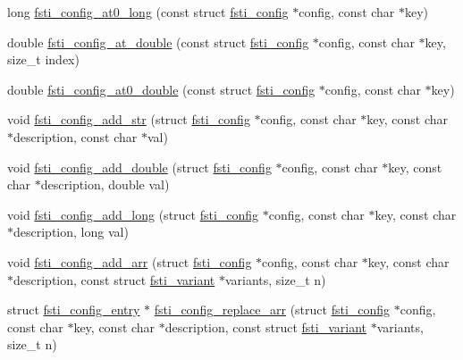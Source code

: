 \begin{DoxyCompactItemize}
\item 
long \mbox{\hyperlink{fsti-config_8c_a9f3d5723f366dc5de1ed8c23c32db499}{fsti\+\_\+config\+\_\+at0\+\_\+long}} (const struct \mbox{\hyperlink{structfsti__config}{fsti\+\_\+config}} $\ast$config, const char $\ast$key)
\item 
double \mbox{\hyperlink{fsti-config_8c_a62f94d64fed8d92993151b3fcbfa6a3f}{fsti\+\_\+config\+\_\+at\+\_\+double}} (const struct \mbox{\hyperlink{structfsti__config}{fsti\+\_\+config}} $\ast$config, const char $\ast$key, size\+\_\+t index)
\item 
double \mbox{\hyperlink{fsti-config_8c_a3e479a269882550f86538865a4c76d1e}{fsti\+\_\+config\+\_\+at0\+\_\+double}} (const struct \mbox{\hyperlink{structfsti__config}{fsti\+\_\+config}} $\ast$config, const char $\ast$key)
\item 
void \mbox{\hyperlink{fsti-config_8c_a3ee06dfcfc2e683469ca7ed25f9dc7a4}{fsti\+\_\+config\+\_\+add\+\_\+str}} (struct \mbox{\hyperlink{structfsti__config}{fsti\+\_\+config}} $\ast$config, const char $\ast$key, const char $\ast$description, const char $\ast$val)
\item 
void \mbox{\hyperlink{fsti-config_8c_ac687fc8ca6887aae337ce8ef4188f089}{fsti\+\_\+config\+\_\+add\+\_\+double}} (struct \mbox{\hyperlink{structfsti__config}{fsti\+\_\+config}} $\ast$config, const char $\ast$key, const char $\ast$description, double val)
\item 
void \mbox{\hyperlink{fsti-config_8c_aeeb0d90b0edb706662e123f6747b2a3c}{fsti\+\_\+config\+\_\+add\+\_\+long}} (struct \mbox{\hyperlink{structfsti__config}{fsti\+\_\+config}} $\ast$config, const char $\ast$key, const char $\ast$description, long val)
\item 
void \mbox{\hyperlink{fsti-config_8c_a5d0a69eb0415adc0b32d29a92c002890}{fsti\+\_\+config\+\_\+add\+\_\+arr}} (struct \mbox{\hyperlink{structfsti__config}{fsti\+\_\+config}} $\ast$config, const char $\ast$key, const char $\ast$description, const struct \mbox{\hyperlink{structfsti__variant}{fsti\+\_\+variant}} $\ast$variants, size\+\_\+t n)
\item 
struct \mbox{\hyperlink{structfsti__config__entry}{fsti\+\_\+config\+\_\+entry}} $\ast$ \mbox{\hyperlink{fsti-config_8c_ac8ebb30eef8cc1e532c95a9bb31e0853}{fsti\+\_\+config\+\_\+replace\+\_\+arr}} (struct \mbox{\hyperlink{structfsti__config}{fsti\+\_\+config}} $\ast$config, const char $\ast$key, const char $\ast$description, const struct \mbox{\hyperlink{structfsti__variant}{fsti\+\_\+variant}} $\ast$variants, size\+\_\+t n)
\item 

\end{DoxyCompactItemize}
